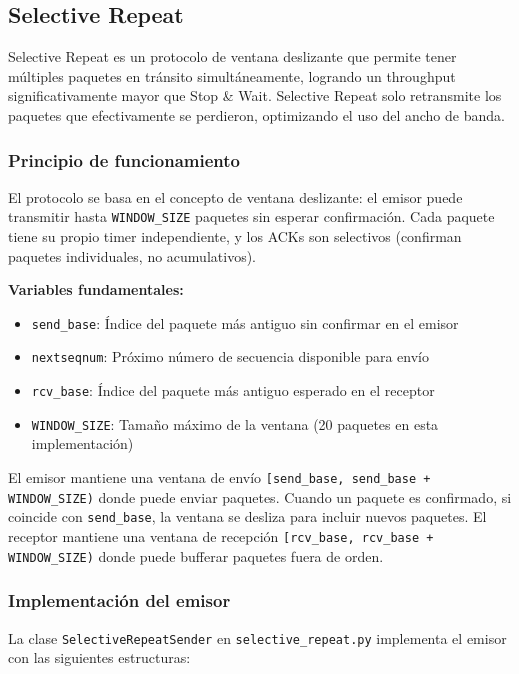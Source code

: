 \subsection{Selective Repeat}

Selective Repeat es un protocolo de ventana deslizante que permite tener múltiples paquetes en tránsito simultáneamente, logrando un throughput significativamente mayor que Stop \& Wait. Selective Repeat solo retransmite los paquetes que efectivamente se perdieron, optimizando el uso del ancho de banda.

\subsubsection{Principio de funcionamiento}

El protocolo se basa en el concepto de ventana deslizante: el emisor puede transmitir hasta \texttt{WINDOW\_SIZE} paquetes sin esperar confirmación. Cada paquete tiene su propio timer independiente, y los ACKs son selectivos (confirman paquetes individuales, no acumulativos).

\textbf{Variables fundamentales:}
\begin{itemize}
    \item \texttt{send\_base}: Índice del paquete más antiguo sin confirmar en el emisor
    \item \texttt{nextseqnum}: Próximo número de secuencia disponible para envío
    \item \texttt{rcv\_base}: Índice del paquete más antiguo esperado en el receptor
    \item \texttt{WINDOW\_SIZE}: Tamaño máximo de la ventana (20 paquetes en esta implementación)
\end{itemize}

El emisor mantiene una ventana de envío \texttt{[send\_base, send\_base + WINDOW\_SIZE)} donde puede enviar paquetes. Cuando un paquete es confirmado, si coincide con \texttt{send\_base}, la ventana se desliza para incluir nuevos paquetes. El receptor mantiene una ventana de recepción \texttt{[rcv\_base, rcv\_base + WINDOW\_SIZE)} donde puede bufferar paquetes fuera de orden.

\subsubsection{Implementación del emisor}

La clase \texttt{SelectiveRepeatSender} en \texttt{selective\_repeat.py} implementa el emisor con las siguientes estructuras:

